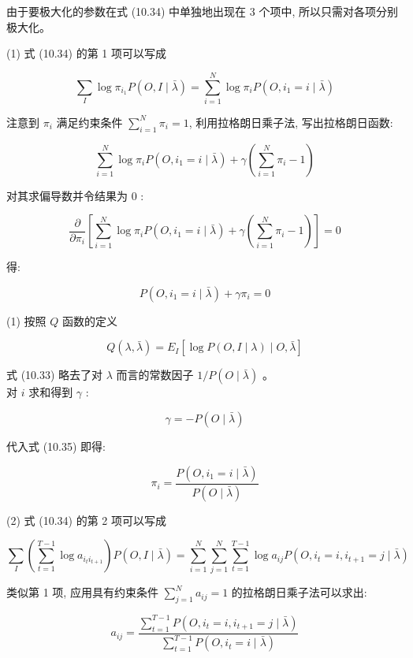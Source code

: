 \documentclass[10pt]{article}
\begin{document}
由于要极大化的参数在式 (10.34) 中单独地出现在 3 个项中, 所以只需对各项分别极大化。

(1) 式 (10.34) 的第 1 项可以写成

$$
\sum_{I} \log \pi_{i_{1}} P(O, I \mid \bar{\lambda})=\sum_{i=1}^{N} \log \pi_{i} P\left(O, i_{1}=i \mid \bar{\lambda}\right)
$$

注意到 $\pi_{i}$ 满足约束条件 $\sum_{i=1}^{N} \pi_{i}=1$, 利用拉格朗日乘子法, 写出拉格朗日函数:

$$
\sum_{i=1}^{N} \log \pi_{i} P\left(O, i_{1}=i \mid \bar{\lambda}\right)+\gamma\left(\sum_{i=1}^{N} \pi_{i}-1\right)
$$

对其求偏导数并令结果为 0 :


\begin{equation*}
\frac{\partial}{\partial \pi_{i}}\left[\sum_{i=1}^{N} \log \pi_{i} P\left(O, i_{1}=i \mid \bar{\lambda}\right)+\gamma\left(\sum_{i=1}^{N} \pi_{i}-1\right)\right]=0 \tag{10.35}
\end{equation*}


得:

$$
P\left(O, i_{1}=i \mid \bar{\lambda}\right)+\gamma \pi_{i}=0
$$

(1) 按照 $Q$ 函数的定义

$$
Q(\lambda, \bar{\lambda})=E_{I}[\log P(O, I \mid \lambda) \mid O, \bar{\lambda}]
$$

式 (10.33) 略去了对 $\lambda$ 而言的常数因子 $1 / P(O \mid \bar{\lambda})$ 。\\
对 $i$ 求和得到 $\gamma$ :

$$
\gamma=-P(O \mid \bar{\lambda})
$$

代入式 (10.35) 即得:


\begin{equation*}
\pi_{i}=\frac{P\left(O, i_{1}=i \mid \bar{\lambda}\right)}{P(O \mid \bar{\lambda})} \tag{10.36}
\end{equation*}


(2) 式 (10.34) 的第 2 项可以写成

$$
\sum_{I}\left(\sum_{t=1}^{T-1} \log a_{i_{t} i_{t+1}}\right) P(O, I \mid \bar{\lambda})=\sum_{i=1}^{N} \sum_{j=1}^{N} \sum_{t=1}^{T-1} \log a_{i j} P\left(O, i_{t}=i, i_{t+1}=j \mid \bar{\lambda}\right)
$$

类似第 1 项, 应用具有约束条件 $\sum_{j=1}^{N} a_{i j}=1$ 的拉格朗日乘子法可以求出:


\begin{equation*}
a_{i j}=\frac{\sum_{t=1}^{T-1} P\left(O, i_{t}=i, i_{t+1}=j \mid \bar{\lambda}\right)}{\sum_{t=1}^{T-1} P\left(O, i_{t}=i \mid \bar{\lambda}\right)} \tag{10.37}
\end{equation*}
\end{document}
